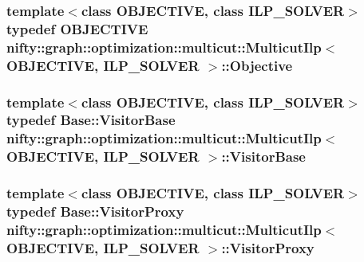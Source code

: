 \subsubsection[{Objective}]{\setlength{\rightskip}{0pt plus 5cm}template$<$class O\+B\+J\+E\+C\+T\+I\+V\+E, class I\+L\+P\+\_\+\+S\+O\+L\+V\+E\+R$>$ typedef O\+B\+J\+E\+C\+T\+I\+V\+E {\bf nifty\+::graph\+::optimization\+::multicut\+::\+Multicut\+Ilp}$<$ O\+B\+J\+E\+C\+T\+I\+V\+E, I\+L\+P\+\_\+\+S\+O\+L\+V\+E\+R $>$\+::{\bf Objective}}\label{classnifty_1_1graph_1_1optimization_1_1multicut_1_1MulticutIlp_a1c9fe5899608fc9c8e32bde6648c8278}
\hypertarget{classnifty_1_1graph_1_1optimization_1_1multicut_1_1MulticutIlp_a0dd77b07238eb761a1db58b058c0186c}{}
\subsubsection[{Visitor\+Base}]{\setlength{\rightskip}{0pt plus 5cm}template$<$class O\+B\+J\+E\+C\+T\+I\+V\+E, class I\+L\+P\+\_\+\+S\+O\+L\+V\+E\+R$>$ typedef {\bf Base\+::\+Visitor\+Base} {\bf nifty\+::graph\+::optimization\+::multicut\+::\+Multicut\+Ilp}$<$ O\+B\+J\+E\+C\+T\+I\+V\+E, I\+L\+P\+\_\+\+S\+O\+L\+V\+E\+R $>$\+::{\bf Visitor\+Base}}\label{classnifty_1_1graph_1_1optimization_1_1multicut_1_1MulticutIlp_a0dd77b07238eb761a1db58b058c0186c}
\hypertarget{classnifty_1_1graph_1_1optimization_1_1multicut_1_1MulticutIlp_ab78a646c0aea8aa633ff7155f349d7a6}{}
\subsubsection[{Visitor\+Proxy}]{\setlength{\rightskip}{0pt plus 5cm}template$<$class O\+B\+J\+E\+C\+T\+I\+V\+E, class I\+L\+P\+\_\+\+S\+O\+L\+V\+E\+R$>$ typedef {\bf Base\+::\+Visitor\+Proxy} {\bf nifty\+::graph\+::optimization\+::multicut\+::\+Multicut\+Ilp}$<$ O\+B\+J\+E\+C\+T\+I\+V\+E, I\+L\+P\+\_\+\+S\+O\+L\+V\+E\+R $>$\+::{\bf Visitor\+Proxy}}\label{classnifty_1_1graph_1_1optimization_1_1multicut_1_1MulticutIlp_ab78a646c0aea8aa633ff7155f349d7a6}


